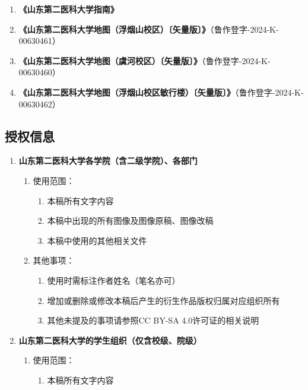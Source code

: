 \begin{enumerate}
    \item \textbf{《山东第二医科大学指南》}
    \item \textbf{《山东第二医科大学地图（浮烟山校区）〔矢量版〕》}（鲁作登字-2024-K-00630461）
    \item \textbf{《山东第二医科大学地图（虞河校区）〔矢量版〕》}（鲁作登字-2024-K-00630460）
    \item \textbf{《山东第二医科大学地图（浮烟山校区敏行楼）〔矢量版〕》}（鲁作登字-2024-K-00630462）
\end{enumerate}

\subsection[授权信息]{授权信息}
\begin{enumerate}
    \item \textbf{山东第二医科大学各学院（含二级学院）、各部门}
          \begin{enumerate}
              \item 使用范围：
                    \begin{enumerate}
                        \item 本稿所有文字内容
                        \item 本稿中出现的所有图像及图像原稿、图像改稿
                        \item 本稿中使用的其他相关文件
                    \end{enumerate}
              \item 其他事项：
                    \begin{enumerate}
                        \item 使用时需标注作者姓名（笔名亦可）
                        \item 增加或删除或修改本稿后产生的衍生作品版权归属对应组织所有
                        \item 其他未提及的事项请参照CC BY-SA 4.0许可证的相关说明
                    \end{enumerate}
          \end{enumerate}
    \item \textbf{山东第二医科大学的学生组织（仅含校级、院级）}
          \begin{enumerate}
              \item 使用范围：
                    \begin{enumerate}
                        \item 本稿所有文字内容

\end{enumerate}
\end{enumerate}
\end{enumerate}
